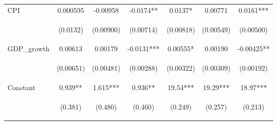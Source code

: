\begin{tabular}{lcccccc}
CPI & 0.000595 & -0.00958 & -0.0174** & 0.0137* & 0.00771 & 0.0161*** \\
\vspace{4pt} & \begin{footnotesize}(0.0132)\end{footnotesize} & \begin{footnotesize}(0.00900)\end{footnotesize} & \begin{footnotesize}(0.00714)\end{footnotesize} & \begin{footnotesize}(0.00818)\end{footnotesize} & \begin{footnotesize}(0.00549)\end{footnotesize} & \begin{footnotesize}(0.00500)\end{footnotesize} \\
GDP\_growth & 0.00613 & 0.00179 & -0.0131*** & 0.00555* & 0.00190 & -0.00425** \\
\vspace{4pt} & \begin{footnotesize}(0.00651)\end{footnotesize} & \begin{footnotesize}(0.00481)\end{footnotesize} & \begin{footnotesize}(0.00288)\end{footnotesize} & \begin{footnotesize}(0.00322)\end{footnotesize} & \begin{footnotesize}(0.00309)\end{footnotesize} & \begin{footnotesize}(0.00192)\end{footnotesize} \\
Constant & 0.939** & 1.615*** & 0.936** & 19.54*** & 19.29*** & 18.97*** \\
 & \begin{footnotesize}(0.381)\end{footnotesize} & \begin{footnotesize}(0.480)\end{footnotesize} & \begin{footnotesize}(0.460)\end{footnotesize} & \begin{footnotesize}(0.249)\end{footnotesize} & \begin{footnotesize}(0.257)\end{footnotesize} & \begin{footnotesize}(0.213)\end{footnotesize} \\

\end{tabular}
